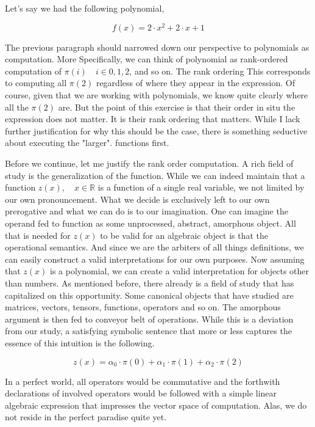 \documentclass[12pt]{article}
\begin{document}
Let's say we had the following polynomial,

\begin{equation}
    f(x) = 2 \cdot x^2 + 2 \cdot x + 1
\end{equation}

The previous paragraph should narrowed down our perspective to polynomials as
computation. More Specifically, we can think of polynomial as rank-ordered
computation of $\pi(i) \quad i \in {0,1,2} $, and so on. The rank ordering This
corresponds to computing all $\pi(2)$ regardless of where they appear in the
expression. Of course, given that we are working with polynomials, we know
quite clearly where all the $\pi(2)$ are. But the point of this exercise is
that their order in situ the expression does not matter. It is their rank
ordering that matters. While I lack further justification for why this should
be the case, there is something seductive about executing the "larger".
functions first.

Before we continue, let me justify the rank order computation. A rich field of
study is the generalization of the function. While we can indeed maintain that
a function $z(x), \quad x \in \mathbb{R}$ is a function of a single real
variable, we not limited by our own pronouncement. What we decide is
exclusively left to our own prerogative and what we can do is to our
imagination. One can imagine the operand fed to function as some unprocessed,
abstract, amorphous object. All that is needed for $z(x)$ to be valid for an
algebraic object is that the operational semantics. And since we are the
arbiters of all things definitions, we can easily construct a valid
interpretations for our own purposes. Now assuming that $z(x)$ is a polynomial,
we can create a valid interpretation for objects other than numbers. As
mentioned before, there already is a field of study that has capitalized on
this opportunity. Some canonical objects that have studied are matrices,
vectors, tensors, functions, operators and so on. The amorphous argument is
then fed to conveyor belt of operations. While this is a deviation from our
study, a satisfying symbolic sentence that more or less captures the essence of
this intuition is the following.

\begin{equation}
    z(x) = \alpha_0 \cdot \pi(0) + \alpha_1 \cdot \pi(1) + \alpha_2 \cdot \pi(2)
\end{equation}

In a perfect world, all operators would be commutative and the forthwith
declarations of involved operators would be followed with a simple linear
algebraic expression that impresses the vector space of computation. Alas, we
do not reside in the perfect paradise quite yet.
\end{document}
